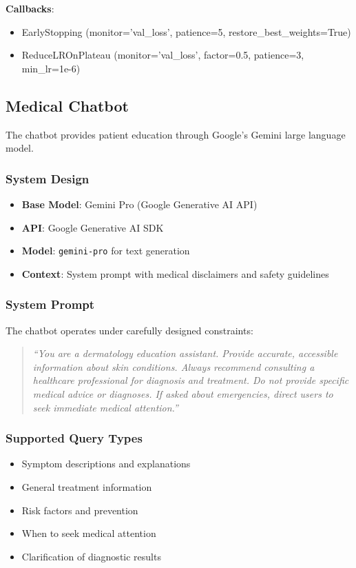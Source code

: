 \documentclass[10pt, twocolumn, letterpaper]{article}
\begin{document}
\textbf{Callbacks}:
\begin{itemize}[leftmargin=*, itemsep=2pt]
    \item EarlyStopping (monitor='val\_loss', patience=5, restore\_best\_weights=True)
    \item ReduceLROnPlateau (monitor='val\_loss', factor=0.5, patience=3, min\_lr=1e-6)
\end{itemize}

\subsection{Medical Chatbot}
The chatbot provides patient education through Google's Gemini large language model.

\subsubsection{System Design}
\begin{itemize}[leftmargin=*, itemsep=2pt]
    \item \textbf{Base Model}: Gemini Pro (Google Generative AI API)
    \item \textbf{API}: Google Generative AI SDK
    \item \textbf{Model}: \texttt{gemini-pro} for text generation
    \item \textbf{Context}: System prompt with medical disclaimers and safety guidelines
\end{itemize}

\subsubsection{System Prompt}
The chatbot operates under carefully designed constraints:
\begin{quote}
\small\textit{``You are a dermatology education assistant. Provide accurate, accessible information about skin conditions. Always recommend consulting a healthcare professional for diagnosis and treatment. Do not provide specific medical advice or diagnoses. If asked about emergencies, direct users to seek immediate medical attention.''}
\end{quote}

\subsubsection{Supported Query Types}
\begin{itemize}[leftmargin=*, itemsep=2pt]
    \item Symptom descriptions and explanations
    \item General treatment information
    \item Risk factors and prevention
    \item When to seek medical attention
    \item Clarification of diagnostic results
\end{itemize}
\end{document}
